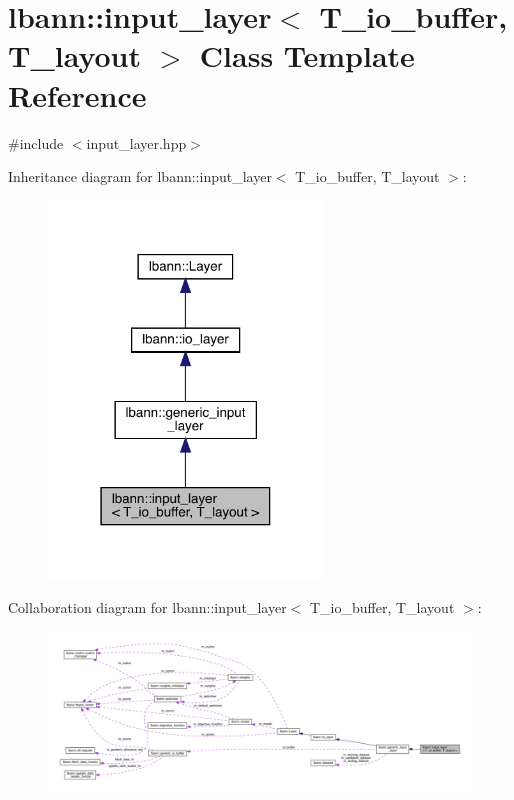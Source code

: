 \hypertarget{classlbann_1_1input__layer}{}\section{lbann\+:\+:input\+\_\+layer$<$ T\+\_\+io\+\_\+buffer, T\+\_\+layout $>$ Class Template Reference}
\label{classlbann_1_1input__layer}


{\ttfamily \#include $<$input\+\_\+layer.\+hpp$>$}



Inheritance diagram for lbann\+:\+:input\+\_\+layer$<$ T\+\_\+io\+\_\+buffer, T\+\_\+layout $>$\+:\nopagebreak
\begin{figure}[H]
\begin{center}
\leavevmode
\includegraphics[width=207pt]{classlbann_1_1input__layer__inherit__graph}
\end{center}
\end{figure}


Collaboration diagram for lbann\+:\+:input\+\_\+layer$<$ T\+\_\+io\+\_\+buffer, T\+\_\+layout $>$\+:\nopagebreak
\begin{figure}[H]
\begin{center}
\leavevmode
\includegraphics[width=350pt]{classlbann_1_1input__layer__coll__graph}
\end{center}
\end{figure}
